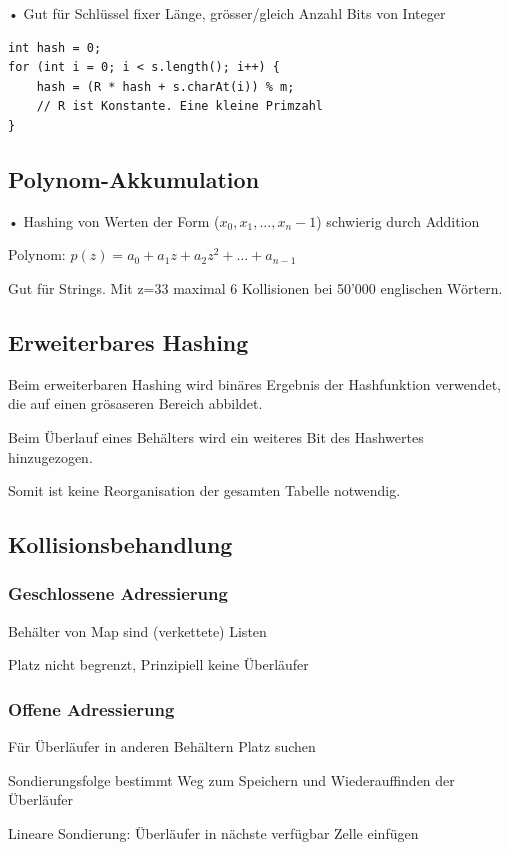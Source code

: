 \begin{multicols*}{4}
		• Gut für Schlüssel fixer Länge, grösser/gleich Anzahl Bits von Integer
		
		\begin{lstlisting}
int hash = 0;
for (int i = 0; i < s.length(); i++) {
	hash = (R * hash + s.charAt(i)) % m;
	// R ist Konstante. Eine kleine Primzahl
}
		\end{lstlisting}	
	
	\subsection{Polynom-Akkumulation}
	• Hashing von Werten der Form ($x_0, x_1 , ..., x_n-1$) schwierig durch Addition
	
	Polynom:
	$p(z) = a_0 + a_1z + a_2z^2 + ... + a_{n-1}$
		
	Gut für Strings. Mit z=33 maximal 6 Kollisionen bei 50'000 englischen Wörtern.

	\subsection{Erweiterbares Hashing}
	Beim erweiterbaren Hashing wird binäres Ergebnis der Hashfunktion verwendet, die auf einen grösaseren Bereich abbildet.
	
	Beim Überlauf eines Behälters wird ein weiteres Bit des Hashwertes hinzugezogen.
	
	Somit ist keine Reorganisation der gesamten Tabelle notwendig.
		
	\subsection{Kollisionsbehandlung}
		\subsubsection{Geschlossene Adressierung}
		Behälter von Map sind (verkettete) Listen
		
		Platz nicht begrenzt, Prinzipiell keine Überläufer
		
		\subsubsection{Offene Adressierung}
		Für Überläufer in anderen Behältern Platz suchen
		
		Sondierungsfolge bestimmt Weg zum Speichern und Wiederauffinden der Überläufer
		
		Lineare Sondierung: Überläufer in nächste verfügbar Zelle einfügen
		

\end{multicols*}
